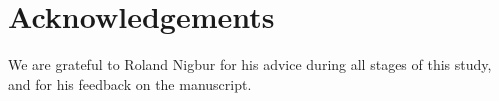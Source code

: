 \section*{Acknowledgements}

We are grateful to Roland Nigbur for his advice during all stages of this study,
and for his feedback on the manuscript.
